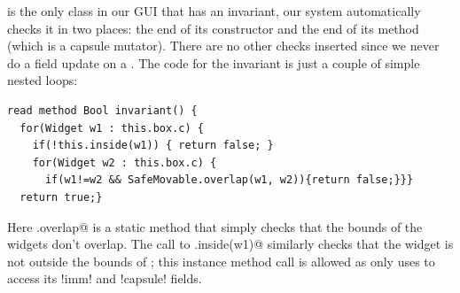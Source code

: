 \Q@SafeMovable@ is the only class in our GUI that has an invariant, our system automatically checks it in two places: the end of its constructor and the end of its \Q@dispatch@ method (which is a capsule mutator). There are no other checks inserted since we never do a field update on a \Q@SafeMovable@. The code for the invariant is just a couple of simple nested loops:
\begin{lstlisting}
read method Bool invariant() {
  for(Widget w1 : this.box.c) {
    if(!this.inside(w1)) { return false; }
    for(Widget w2 : this.box.c) {
      if(w1!=w2 && SafeMovable.overlap(w1, w2)){return false;}}}
  return true;}
\end{lstlisting}

Here \Q@SafeMovable.overlap@ is a static method that simply checks that the bounds of the widgets don't overlap. The call to \Q@this.inside(w1)@ similarly checks that the widget is not outside the bounds of \Q@this@; this instance method call is allowed as \Q@inside@ only uses \Q@this@ to access its \Q!imm! and \Q!capsule! fields.%


